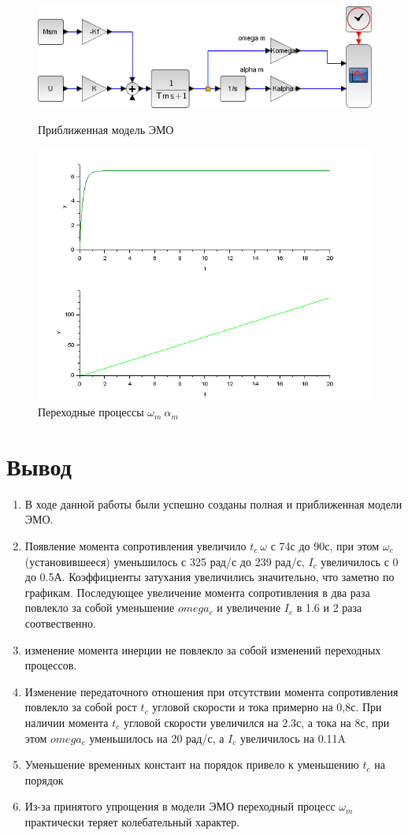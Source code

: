 \documentclass[a4paper,12pt,russian]{article} %
\begin{document}
\begin{figure}[H]
	\includegraphics[width=\linewidth]{7.png}
	\caption{Приближенная модель ЭМО}\label{p7}
	\endminipage\hfill
	\includegraphics[width=\linewidth]{72.png}
	\caption{Переходные процессы  $\omega_m\: \alpha_m$}\label{p72}
	\endminipage
\end{figure}

\section{Вывод}
\begin{enumerate}
	\item В ходе данной работы были успешно созданы полная и приближенная модели ЭМО.
	\item Появление момента сопротивления увеличило $t_c\: \omega$ с 74с до 90с, при этом $\omega_c$(установившееся) уменьшилось с 325 рад/с до 239 рад/с, $I_c$ увеличилось с 0 до 0.5А. Коэффициенты затухания увеличились значительно, что заметно по графикам. Последующее увеличение момента сопротивления в два раза повлекло за собой уменьшение $omega_c$ и увеличение $I_c$ в 1.6 и 2 раза соотвественно.
	\item изменение момента инерции не повлекло за собой изменений переходных процессов.
	\item Изменение передаточного отношения при отсутствии момента сопротивления повлекло за собой рост $t_c$ угловой скорости и тока примерно на 0,8с. При наличии момента $t_c$ угловой скорости увеличился на 2.3с, а тока на 8с, при этом $omega_c$ уменьшилось на 20 рад/с, а $I_c$ увеличилось на 0.11A
	\item Уменьшение временных констант на порядок привело к уменьшению $t_c$ на порядок
	\item Из-за принятого упрощения в модели ЭМО переходный процесс $\omega_m$ практически теряет колебательный характер. 
\end{enumerate}
\end{document}
